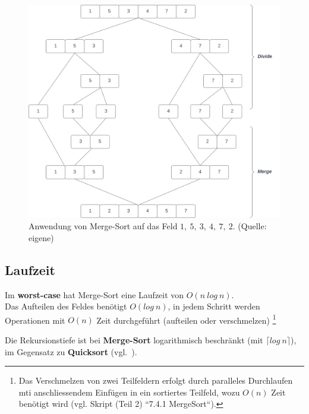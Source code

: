 \begin{figure}
    \begin{center}
        \includegraphics[scale=0.3]{chapters/Sortierverfahren/img/mergesort}
        \caption{Anwendung von Merge-Sort auf das Feld $1,\ 5,\ 3,\ 4,\ 7,\ 2$.  (Quelle: eigene)}
        \label{fig:mergesort}
    \end{center}
\end{figure}


\subsection{Laufzeit}
Im \textbf{worst-case} hat Merge-Sort eine Laufzeit von $O(n\ log\ n)$.\\
Das Aufteilen des Feldes benötigt $O(log\ n)$, in jedem Schritt werden Operationen mit $O(n)$ Zeit durchgeführt (aufteilen  oder verschmelzen) \footnote{
Das Verschmelzen von zwei Teilfeldern erfolgt durch paralleles Durchlaufen mti anschliessendem Einfügen in ein sortiertes Teilfeld, wozu $O(n)$ Zeit benötigt wird (vgl. Skript (Teil 2) ``7.4.1 MergeSort``).
}

\begin{tcolorbox}
    Die Rekursionstiefe ist bei \textbf{Merge-Sort} logarithmisch beschränkt (mit $\lceil log\ n \rceil$), im Gegensatz zu \textbf{Quicksort} (vgl.~\cite[116]{OW17b}).
\end{tcolorbox}